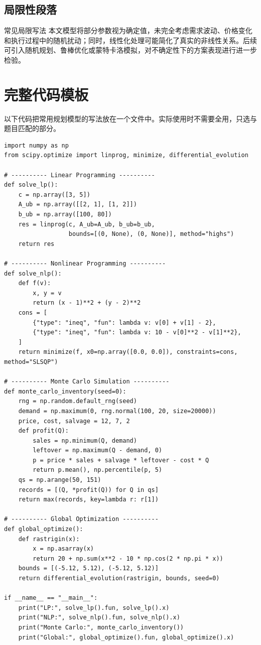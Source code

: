 \documentclass[11pt,a4paper]{ctexart}
\begin{document}
\subsection{局限性段落}
\begin{notebox}{常见局限写法}
本文模型将部分参数视为确定值，未完全考虑需求波动、价格变化和执行过程中的随机扰动；同时，线性化处理可能简化了真实的非线性关系。后续可引入随机规划、鲁棒优化或蒙特卡洛模拟，对不确定性下的方案表现进行进一步检验。
\end{notebox}

\section{完整代码模板}
以下代码把常用规划模型的写法放在一个文件中。实际使用时不需要全用，只选与题目匹配的部分。

\begin{lstlisting}
import numpy as np
from scipy.optimize import linprog, minimize, differential_evolution

# ---------- Linear Programming ----------
def solve_lp():
    c = np.array([3, 5])
    A_ub = np.array([[2, 1], [1, 2]])
    b_ub = np.array([100, 80])
    res = linprog(c, A_ub=A_ub, b_ub=b_ub,
                  bounds=[(0, None), (0, None)], method="highs")
    return res

# ---------- Nonlinear Programming ----------
def solve_nlp():
    def f(v):
        x, y = v
        return (x - 1)**2 + (y - 2)**2
    cons = [
        {"type": "ineq", "fun": lambda v: v[0] + v[1] - 2},
        {"type": "ineq", "fun": lambda v: 10 - v[0]**2 - v[1]**2},
    ]
    return minimize(f, x0=np.array([0.0, 0.0]), constraints=cons, method="SLSQP")

# ---------- Monte Carlo Simulation ----------
def monte_carlo_inventory(seed=0):
    rng = np.random.default_rng(seed)
    demand = np.maximum(0, rng.normal(100, 20, size=20000))
    price, cost, salvage = 12, 7, 2
    def profit(Q):
        sales = np.minimum(Q, demand)
        leftover = np.maximum(Q - demand, 0)
        p = price * sales + salvage * leftover - cost * Q
        return p.mean(), np.percentile(p, 5)
    qs = np.arange(50, 151)
    records = [(Q, *profit(Q)) for Q in qs]
    return max(records, key=lambda r: r[1])

# ---------- Global Optimization ----------
def global_optimize():
    def rastrigin(x):
        x = np.asarray(x)
        return 20 + np.sum(x**2 - 10 * np.cos(2 * np.pi * x))
    bounds = [(-5.12, 5.12), (-5.12, 5.12)]
    return differential_evolution(rastrigin, bounds, seed=0)

if __name__ == "__main__":
    print("LP:", solve_lp().fun, solve_lp().x)
    print("NLP:", solve_nlp().fun, solve_nlp().x)
    print("Monte Carlo:", monte_carlo_inventory())
    print("Global:", global_optimize().fun, global_optimize().x)
\end{lstlisting}
\end{document}
